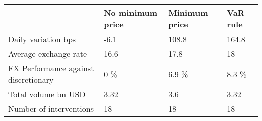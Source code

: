 \begin{tabular}{llll}
\toprule
{} & No minimum price & Minimum price & VaR rule \\
\midrule
Daily variation bps                  &             -6.1 &         108.8 &    164.8 \\
Average exchange rate                &             16.6 &          17.8 &       18 \\
FX Performance against discretionary &              0 \% &         6.9 \% &    8.3 \% \\
Total volume bn USD                  &             3.32 &           3.6 &     3.32 \\
Number of interventions              &               18 &            18 &       18 \\
\bottomrule
\end{tabular}
